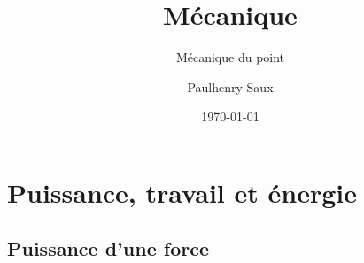 \documentclass[french]{yLectureNote}
\title{Mécanique}
\subtitle{Mécanique du point}
\author{Paulhenry Saux}
\date{\today}
\renewcommand{\vec}{\overrightarrow}
\newcommand{\norm}[1]{||\vec{#1}||}
\begin{document}
\setcounter{chapter}{7}
	\chapter{Puissance, travail et énergie}
%
%
%
%
\section{Puissance d'une force}
\end{document}
